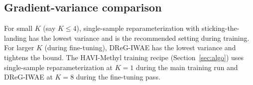 \subsection*{Gradient-variance comparison}
For small $K$ (say $K\le 4$), single-sample reparameterization with sticking-the-landing has the lowest variance and is the recommended setting during training. For larger $K$ (during fine-tuning), DReG-IWAE has the lowest variance and tightens the bound. The HAVI-Methyl training recipe (Section~\ref{sec:algo}) uses single-sample reparameterization at $K=1$ during the main training run and DReG-IWAE at $K=8$ during the fine-tuning pass.
